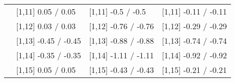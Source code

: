 \begin{table}
\begin{tabular}[t]{llll}
 & {}[1,11] 0.05  / 0.05 & {}[1,11] -0.5  / -0.5 & {}[1,11] -0.11  / -0.11\\
 & {}[1,12] 0.03  / 0.03 & {}[1,12] -0.76  / -0.76 & {}[1,12] -0.29  / -0.29\\
\addlinespace
 & {}[1,13] -0.45  / -0.45 & {}[1,13] -0.88  / -0.88 & {}[1,13] -0.74  / -0.74\\
 & {}[1,14] -0.35  / -0.35 & {}[1,14] -1.11  / -1.11 & {}[1,14] -0.92  / -0.92\\
 & {}[1,15] 0.05  / 0.05 & {}[1,15] -0.43  / -0.43 & {}[1,15] -0.21  / -0.21\\
\bottomrule
\end{tabular}
\end{table}
